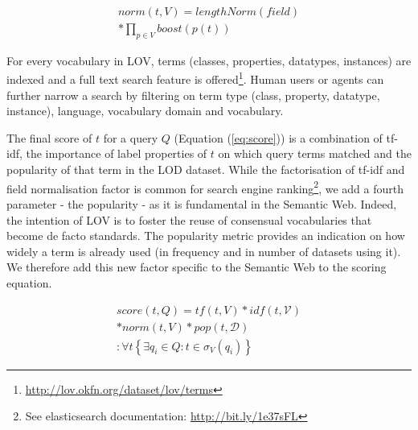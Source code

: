 \documentclass{iosart2c}
\begin{document}
\begin{equation}\label{eq:norm}
\begin{split}
norm(t,V) =  lengthNorm(field) \\
* \prod_{p \in V} boost(p(t))
\end{split}
\end{equation}

For every vocabulary in LOV, terms (classes, properties, datatypes, instances) are indexed and a full text search feature is offered\footnote{\url{http://lov.okfn.org/dataset/lov/terms}}. Human users or agents can further narrow a search by filtering on term type (class, property, datatype, instance), language, vocabulary domain and vocabulary.

The final score of $t$ for a query $Q$ (Equation (\ref{eq:score})) is a combination of tf-idf, the importance of label properties of $t$ on which query terms matched and the popularity of that term in the LOD dataset. While the factorisation of tf-idf and field normalisation factor is common for search engine ranking\footnote{See elasticsearch documentation: \url{http://bit.ly/1e37sFL}}, we add a fourth parameter - the popularity - as it is fundamental in the Semantic Web. Indeed, the intention of LOV is to foster the reuse of consensual vocabularies that become de facto standards. The popularity metric provides an indication on how widely a term is already used (in frequency and in number of datasets using it). We therefore add this new factor specific to the Semantic Web to the scoring equation.
 

\begin{equation}\label{eq:score}
\begin{split}
score(t,Q) =tf(t,V) * idf(t,\mathcal{V}) \\
* norm(t,V) * pop(t,\mathcal{D})\\
: \forall t\left\{\exists q_i \in Q: t \in \sigma_V(q_i)\right\}
\end{split}
\end{equation}
\end{document}
